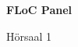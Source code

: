 \documentclass[a4paper]{article}
\begin{document}
\printGenericVSLHeader
\begin{center}
\begin{vsltext}{3cm}{4cm}

   \vspace{0.5cm} 

    \textbf{FLoC Panel} 

    \vspace{1.5cm}

    Hörsaal 1

\end{vsltext}

\end{center}
\end{document}
